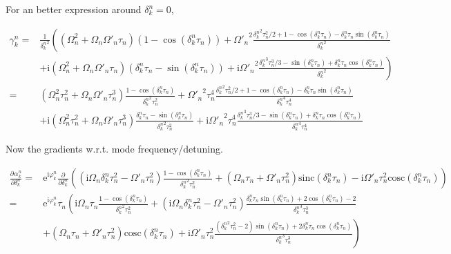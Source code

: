 \documentclass[10pt,fleqn]{article}
\newcommand{\ue}{\mathrm{e}}
\newcommand{\ui}{\mathrm{i}}
\newcommand{\eqar}[1]
{
  \begin{align*}
    #1
  \end{align*}
}
\newcommand{\paren}[1]{{\left({#1}\right)}}
\newcommand{\lparen}[1]{{\left({#1}\right.}}
\newcommand{\rparen}[1]{{\left.{#1}\right)}}
\newcommand{\pdiff}[3][{}]{{\frac{\partial^{#1} {#2}}{\partial {#3}{}^{#1}}}}
\begin{document}
For an better expression around $\delta_k^n=0$,
\eqar{
  \gamma_k^n=&\frac{1}{{\delta_k^n}^2}
  \lparen{
    \paren{\Omega_n^2+\Omega_n\Omega'_n\tau_n}\paren{1-\cos\paren{{\delta_k^n}\tau_n}}
    +{\Omega'_n}^2\frac{{\delta_k^n}^2\tau_n^2/2+1-\cos\paren{{\delta_k^n}\tau_n}
      -{\delta_k^n}\tau_n\sin\paren{{\delta_k^n}\tau_n}}{{\delta_k^n}^2}
  }\\
  &\rparen{
    +\ui\paren{\Omega_n^2+\Omega_n\Omega'_n\tau_n}\paren{\delta_k^n\tau_n-\sin\paren{{\delta_k^n}\tau_n}}
    +\ui{\Omega'_n}^2\frac{
      {\delta_k^n}^3\tau_n^3/3
      -\sin\paren{{\delta_k^n}\tau_n}
      +{\delta_k^n}\tau_n\cos\paren{{\delta_k^n}\tau_n}
    }{{\delta_k^n}^2}
  }\\
  =&\paren{\Omega_n^2\tau_n^2+\Omega_n\Omega'_n\tau_n^3}\frac{1-\cos\paren{{\delta_k^n}\tau_n}}{{\delta_k^n}^2\tau_n^2}
  +{\Omega'_n}^2\tau_n^4\frac{{\delta_k^n}^2\tau_n^2/2+1-\cos\paren{{\delta_k^n}\tau_n}
    -{\delta_k^n}\tau_n\sin\paren{{\delta_k^n}\tau_n}}{{\delta_k^n}^4\tau_n^4}\\
  &+\ui\paren{\Omega_n^2\tau_n^2+\Omega_n\Omega'_n\tau_n^3}\frac{\delta_k^n\tau_n-\sin\paren{{\delta_k^n}\tau_n}}{{\delta_k^n}^2\tau_n^2}
  +\ui{\Omega'_n}^2\tau_n^4\frac{
    {\delta_k^n}^3\tau_n^3/3
    -\sin\paren{{\delta_k^n}\tau_n}
    +{\delta_k^n}\tau_n\cos\paren{{\delta_k^n}\tau_n}
  }{{\delta_k^n}^4\tau_n^4}
}

Now the gradients w.r.t. mode frequency/detuning.
\eqar{
  \pdiff{\alpha_k^n}{\delta_k^n}=&\ue^{\ui\varphi_k^n}\pdiff{}{\delta_k^n}\paren{
    \paren{\ui\Omega_n\delta_k^n\tau_n^2-\Omega'_n\tau_n^2}\frac{1-\cos\paren{\delta_k^n\tau_n}}{{\delta_k^n}^2\tau_n^2}
    +\paren{\Omega_n\tau_n+\Omega'_n\tau_n^2}\mathrm{sinc}\paren{\delta_k^n\tau_n}
    -\ui\Omega'_n\tau_n^2\mathrm{cosc}\paren{\delta_k^n\tau_n}
  }\\
  =&\ue^{\ui\varphi_k^n}\tau_n\lparen{
    \ui\Omega_n\tau_n\frac{1-\cos\paren{\delta_k^n\tau_n}}{{\delta_k^n}^2\tau_n^2}
    +\paren{\ui\Omega_n\delta_k^n\tau_n^2-\Omega'_n\tau_n^2}
    \frac{\delta_k^n\tau_n\sin\paren{\delta_k^n\tau_n}+2\cos\paren{\delta_k^n\tau_n}-2}{{\delta_k^n}^3\tau_n^3}
  }\\
  &\rparen{
    +\paren{\Omega_n\tau_n+\Omega'_n\tau_n^2}\mathrm{cosc}\paren{\delta_k^n\tau_n}
    +\ui\Omega'_n\tau_n^2
    \frac{\paren{{\delta_k^n}^2\tau_n^2-2}\sin\paren{\delta_k^n\tau_n}+2\delta_k^n\tau_n\cos\paren{\delta_k^n\tau_n}}{{\delta_k^n}^3\tau_n^3}
  }
}
\end{document}

